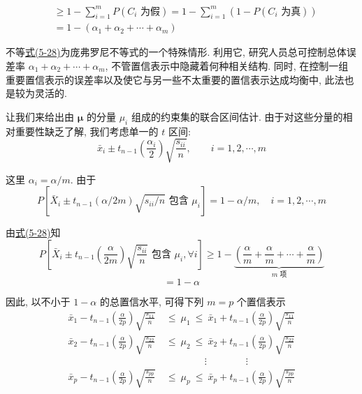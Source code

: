 \label{eq:5-28}
\begin{equation}
\begin{aligned}
&\ge 1-\sum_{i=1}^{m}P(C_{i}\text{ 为假})=1-\sum_{i=1}^{m}(1-P(C_{i}\text{ 为真}))\\
&=1-(\alpha_{1}+\alpha_{2}+\cdots+\alpha_{m})
\end{aligned} \tag{5-28}
\end{equation}

不等\hyperref[eq:5-28]{式(5-28)}为庞弗罗尼不等式的一个特殊情形. 利用它, 研究人员总可控制总体误差率 $\alpha_{1}+\alpha_{2}+\cdots+\alpha_{m}$, 不管置信表示中隐藏着何种相关结构. 同时, 在控制一组重要置信表示的误差率以及使它与另一些不太重要的置信表示达成均衡中, 此法也是较为灵活的.

让我们来给出由 $\boldsymbol{\mu}$ 的分量 $\mu_{i}$ 组成的约束集的联合区间估计. 由于对这些分量的相对重要性缺乏了解, 我们考虑单一的 $t$ 区间:
\[
\bar{x}_{i}\pm t_{n-1}\left(\frac{\alpha_{i}}{2}\right)\sqrt{\frac{s_{ii}}{n}}, \qquad i=1,2,\cdots,m
\]

这里 $\alpha_{i}=\alpha/m$. 由于
\[
P[\bar{X}_{i}\pm t_{n-1}(\alpha/2m)\sqrt{s_{ii}/n}\text{ 包含 }\mu_{i}]=1-\alpha/m, \quad i=1,2,\cdots,m
\]

由\hyperref[eq:5-28]{式(5-28)}知
\[
P\left[\bar{X}_{i}\pm t_{n-1}\left(\frac{\alpha}{2m}\right)\sqrt{\frac{s_{ii}}{n}}\text{ 包含 }\mu_{i}, \forall i\right]\ge 1-\underbrace{\left(\frac{\alpha}{m}+\frac{\alpha}{m}+\cdots+\frac{\alpha}{m}\right)}_{m\text{ 项}}
\]
\[
=1-\alpha
\]

因此, 以不小于 $1-\alpha$ 的总置信水平, 可得下列 $m=p$ 个置信表示
\label{eq:5-29}
\begin{equation}
\begin{aligned}
\bar{x}_{1}-t_{n-1}\left(\frac{\alpha}{2p}\right)\sqrt{\frac{s_{11}}{n}}\ &\le\ \mu_{1}\ \le\ \bar{x}_{1}+t_{n-1}\left(\frac{\alpha}{2p}\right)\sqrt{\frac{s_{11}}{n}}\\
\bar{x}_{2}-t_{n-1}\left(\frac{\alpha}{2p}\right)\sqrt{\frac{s_{22}}{n}}\ &\le\ \mu_{2}\ \le\ \bar{x}_{2}+t_{n-1}\left(\frac{\alpha}{2p}\right)\sqrt{\frac{s_{22}}{n}}\\
&\qquad\qquad\vdots\qquad\qquad\vdots\\
\bar{x}_{p}-t_{n-1}\left(\frac{\alpha}{2p}\right)\sqrt{\frac{s_{pp}}{n}}\ &\le\ \mu_{p}\ \le\ \bar{x}_{p}+t_{n-1}\left(\frac{\alpha}{2p}\right)\sqrt{\frac{s_{pp}}{n}}
\end{aligned} \tag{5-29}
\end{equation}

